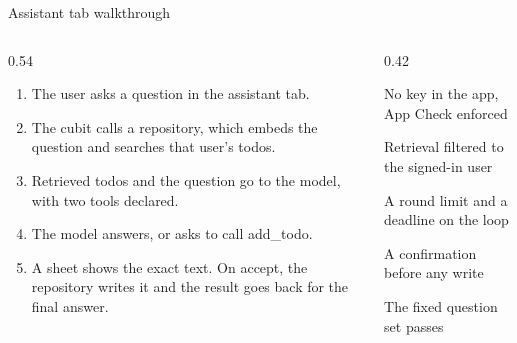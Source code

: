 \documentclass[10pt,aspectratio=169,t]{beamer}
\begin{document}
\begin{frame}[eyebrow=In the app]{Assistant tab walkthrough}
  \begin{columns}[T]
    \begin{column}{0.54\textwidth}
      \begin{enumerate}
        \item The user asks a question in the assistant tab.
        \item The cubit calls a repository, which embeds the question and searches that user's todos.
        \item Retrieved todos and the question go to the model, with two tools declared.
        \item The model answers, or asks to call add\_todo.
        \item A sheet shows the exact text. On accept, the repository writes it and the result goes back for the final answer.
      \end{enumerate}
    \end{column}
    \begin{column}{0.42\textwidth}
      \begin{checklist}
        \item No key in the app, App Check enforced
        \item Retrieval filtered to the signed-in user
        \item A round limit and a deadline on the loop
        \item A confirmation before any write
        \item The fixed question set passes
      \end{checklist}
    \end{column}
  \end{columns}
\end{frame}
\end{document}
